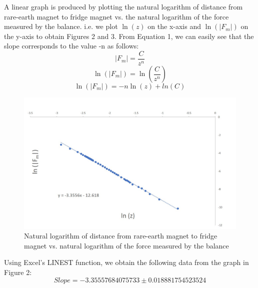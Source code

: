 \documentclass[letterpaper]{article}
\begin{document}
A linear graph is produced by plotting the natural logarithm of distance from rare-earth magnet to fridge magnet vs. the natural logarithm of the force measured by the balance.
i.e. we plot $\ln(z)$ on the x-axis and $\ln(|F_m|)$ on the y-axis to obtain Figures 2 and 3.
From Equation 1, we can easily see that the slope corresponds to the value -n as follows:
$$|F_m|=\frac{C}{z^n}$$
$$\ln(|F_m|)=\ln\left(\frac{C}{z^n}\right)$$
$$\ln(|F_m|)=-n\ln(z)+ln(C)$$

\begin{figure}[H]
 \centering
 \includegraphics[width=\textwidth]{ferromagnet.jpg}
 \caption{Natural logarithm of distance from rare-earth magnet to fridge magnet vs. natural logarithm of the force measured by the balance }
\end{figure}

\noindent Using Excel's LINEST function, we obtain the following data from the graph in Figure 2:
$$Slope =-3.35557684075733 \pm 0.018881754523524 $$
\end{document}
